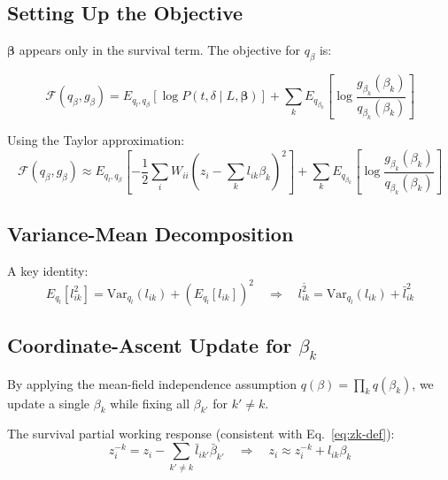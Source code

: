 \documentclass{article}[12pt]
\newcommand{\lbar}[2]{\bar{l}_{#1#2}}
\newcommand{\bbar}[1]{\bar{\beta}_{#1}}
\newcommand{\lsec}[2]{\overline{l^{2}_{#1#2}}}
\begin{document}
\subsection{Setting Up the Objective}

$\bm{\beta}$ appears only in the survival term. The objective for $q_\beta$ is:

\begin{equation}
    \mathcal{F}(q_\beta, g_\beta)
    = E_{q_l,q_\beta}\!\left[\log P(t,\delta \mid L,\bm{\beta})\right]
    + \sum_k E_{q_{\beta_k}}\!\left[\log\frac{g_{\beta_k}(\beta_k)}{q_{\beta_k}(\beta_k)}\right]
    \label{eq:Fqb}
\end{equation}

Using the Taylor approximation:
\begin{equation}
    \mathcal{F}(q_\beta, g_\beta)
    \approx E_{q_l,q_\beta}\!\left[-\frac{1}{2}\sum_i W_{ii}
      \left(z_i - \sum_k l_{ik}\beta_k\right)^2\right]
    + \sum_k E_{q_{\beta_k}}\!\left[\log\frac{g_{\beta_k}(\beta_k)}{q_{\beta_k}(\beta_k)}\right]
    \label{eq:Fqb-approx}
\end{equation}

\subsection{Variance-Mean Decomposition}

A key identity:
\begin{equation}
    E_{q_l}\!\left[l_{ik}^{2}\right]
    = \mathrm{Var}_{q_l}(l_{ik}) + \left(E_{q_l}[l_{ik}]\right)^2
    \quad\Rightarrow\quad
    \lsec{i}{k} = \mathrm{Var}_{q_l}(l_{ik}) + \lbar{i}{k}^2
\end{equation}

\subsection{Coordinate-Ascent Update for $\beta_k$}

By applying the mean-field independence assumption $q(\beta) = \prod_k q(\beta_k)$,
we update a single $\beta_k$ while fixing all $\beta_{k'}$ for $k'\neq k$.

The survival partial working response (consistent with Eq.~\ref{eq:zk-def}):
\begin{equation}
    z^{-k}_i = z_i - \sum_{k'\neq k}\lbar{i}{k'}\bbar{k'}
    \quad\Rightarrow\quad
    z_i \approx z^{-k}_i + l_{ik}\beta_k
\end{equation}
\end{document}
